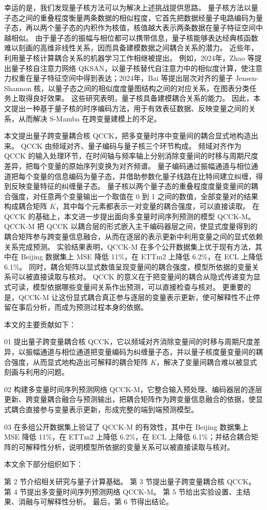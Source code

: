 幸运的是，我们发现量子核方法可以为解决上述挑战提供思路。
量子核方法以量子态之间的重叠程度衡量两条数据的相似程度，它首先把数据经量子电路编码为量子态，再以两个量子态的内积作为核值，核值越大表示两条数据在量子特征空间中越相似。
由于量子态的振幅与相位都可以携带信息，量子核能够表达经典核函数难以刻画的高维非线性关系，因而具备建模数据之间耦合关系的潜力。
近些年，利用量子核计算耦合关系的机器学习工作相继被提出。
例如，2024年，Zhao 等提出量子核自注意力网络 QKSAN，以量子核替代自注意力中的相似度计算，使注意力权重在量子特征空间中得到表达\cite{zhao2024qksan}；2024年，Bai 等提出层次对齐的量子 Jensen-Shannon 核，以量子态之间的相似度度量图结构之间的对应关系，在图表分类任务上取得良好效果\cite{bai2024haqjsk}。
这些研究表明，量子核具备建模耦合关系的能力。
因此，本文提出一种基于量子核的时序编码方法，用于有效表征数据、反映变量之间的关系，从而解决 S-Mamba 在跨变量建模上的不足。

本文提出量子跨变量耦合核 QCCK，把多变量时序中变量间的耦合显式地构造出来。
QCCK 由频域对齐、量子编码与量子核三个环节构成。
频域对齐作为 QCCK 的输入处理环节，在时间轴与频率轴上分别消除变量间的时移与周期尺度差异，把每个变量的原始序列变换为对齐频谱。
量子编码通过振幅通道与相位通道把每个变量的信息编码为量子态，并借助参数化量子线路在比特间建立纠缠，得到反映变量特征的纠缠量子态。
量子核以两个量子态的重叠程度度量变量间的耦合强度，对任意两个变量输出一个取值在 0 到 1 之间的数值，全部变量对的结果构成耦合矩阵 $K$，其中每个元素都表示一对变量的耦合强度，可以直接读取。
在 QCCK 的基础上，本文进一步提出面向多变量时间序列预测的模型 QCCK-M。QCCK-M 把 QCCK 以耦合层的形式嵌入主干编码器层之间，使显式度量得到的耦合矩阵参与跨变量信息融合，从而在逐层的表示更新中利用变量之间的显式依赖关系完成预测。
实验结果表明，QCCK-M 在多个公开数据集上优于现有方法，其中在 Beijing 数据集上 MSE 降低 11\%，在 ETTm2 上降低 6.2\%，在 ECL 上降低 6.1\%。
同时，耦合矩阵以显式数值呈现变量间的耦合强度，模型所依据的变量关系可以被直接读取与核对。
QCCK 的意义在于把变量间的耦合从隐式传递变为显式可读，模型依据哪些变量间关系作出预测，可以直接检查与核对。
更重要的是，QCCK-M 让这份显式耦合真正参与逐层的变量表示更新，使可解释性不止停留在事后分析，而成为预测过程本身的依据。

本文的主要贡献如下：

01 提出量子跨变量耦合核 QCCK，它以频域对齐消除变量间的时移与周期尺度差异，以振幅通道与相位通道把变量编码为纠缠量子态，并以量子核度量变量间的耦合强度，从而显式地构造出可解释的耦合矩阵 $K$，解决了变量间耦合难以被显式刻画与利用的问题。

02 构建多变量时间序列预测网络 QCCK-M，它整合输入预处理、编码器层的逐层更新、跨变量耦合融合与预测输出，把耦合矩阵作为跨变量信息融合的依据，使显式耦合直接参与变量表示更新，形成完整的端到端预测模型。

03 在多组公开数据集上验证了 QCCK-M 的有效性，其中在 Beijing 数据集上 MSE 降低 11\%，在 ETTm2 上降低 6.2\%，在 ECL 上降低 6.1\%；并结合耦合矩阵的可解释性分析，说明模型所依据的变量关系可以被直接读取与核对。

本文余下部分组织如下：

第 2 节介绍相关研究与量子计算基础。
第 3 节提出量子跨变量耦合核 QCCK。
第 4 节提出多变量时间序列预测网络 QCCK-M。
第 5 节给出实验设置、主结果、消融与可解释性分析。
最后，第 6 节得出结论。
